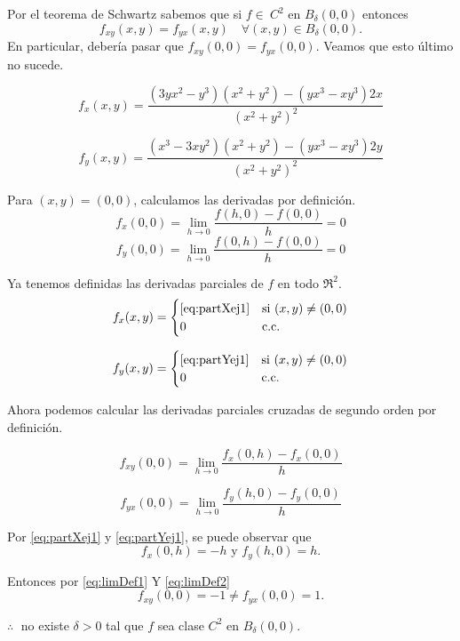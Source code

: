 \begin{solution}
    Por el teorema de Schwartz sabemos que si $f \in\ C^2$ en  $B_{\delta}(0,0)$
    entonces $$  f_{xy} (x,y) = f_{yx} (x,y) \quad \forall (x,y) \in B_{\delta}(0,0).$$ En particular, deber\'ia pasar que $f_{xy} (0,0) = f_{yx}(0,0).$ Veamos que esto \'ultimo no sucede.

    \begin{equation}
        f_x(x,y) = \frac{(3yx^2-y^3)(x^2+y^2) - (yx^3-xy^3)2x}{(x^2+y^2)^2} \label{eq:partXej1}
    \end{equation}

    \begin{equation}
        f_y(x,y) = \frac{(x^3-3xy^2)(x^2+y^2) - (yx^3-xy^3)2y}{(x^2+y^2)^2}  \label{eq:partYej1}
    \end{equation}

    Para $(x,y) = (0,0)$, calculamos las derivadas por definición.
    \[
        f_x(0,0)  = \lim_{h\to0} \frac{f(h,0) - f(0,0)}{h} = 0
    \]
    \[
        f_y(0,0)  =  \lim_{h\to0} \frac{f(0,h) - f(0,0)}{h} = 0
    \]

    Ya tenemos definidas las derivadas parciales de $f$ en todo $\Re^{2}.$
    \[
        f_x(x,y) =
        \begin{cases}
            \eqref{eq:partXej1} & \text{si}\ (x,y) \neq (0,0) \\
            0                   & \text{c.c.}
        \end{cases}
    \]

    \[
        f_y(x,y) =
        \begin{cases}
            \eqref{eq:partYej1} & \text{si}\ (x,y) \neq (0,0) \\
            0                   & \text{c.c.}
        \end{cases}
    \]

    Ahora podemos calcular las derivadas parciales cruzadas de segundo orden por definición.

    \begin{equation}
        f_{xy}(0,0) = \lim_{h\to0} \frac{f_x(0,h) - f_x(0,0)}{h} \label{eq:limDef1}
    \end{equation}

    \begin{equation}
        f_{yx}(0,0) = \lim_{h\to0} \frac{f_y(h,0) - f_y(0,0)}{h}  \label{eq:limDef2}
    \end{equation}

    Por \eqref{eq:partXej1} y \eqref{eq:partYej1}, se puede observar que
    \[
        f_x(0,h) = -h \text{ y } f_y(h,0) = h.
    \]

    Entonces por \eqref{eq:limDef1} Y \eqref{eq:limDef2}
    \[
        f_{xy}(0,0) = -1 \neq f_{yx}(0,0) = 1.
    \]

    $\therefore\;$ no existe $\delta>0$ tal que $f$ sea clase $C^2$ en $B_{\delta}(0,0)$.
\end{solution}

